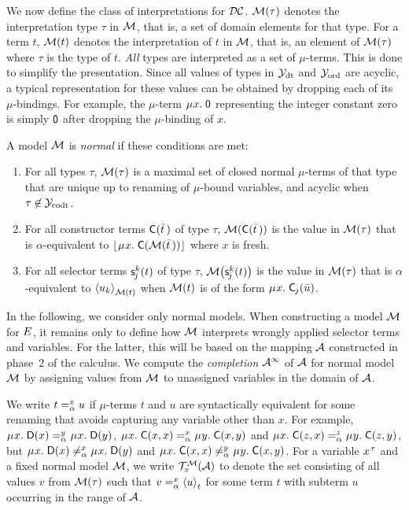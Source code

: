 We now define the class of interpretations for $\thD$.
$\M( \tau )$ denotes the interpretation type $\tau$ in $\M$,
that is, a set of domain elements for that type.
For a term $t$, $\M( t )$ denotes the interpretation of $t$ in $\M$,
that is, an element of $\M( \tau )$ where $\tau$ is the type of $t$.
\emph{All} types are interpreted as a set of $\mu$-terms.
This is done to simplify the presentation.
Since all values of types in $\Data$ and $\Nondata$ are acyclic,
a typical representation for these values can be obtained by
dropping each of its $\mu$-bindings. 
For example, the $\mu$-term $\MU x.\; \const{0}$ representing the integer constant zero
is simply $\const{0}$ after dropping the $\mu$-binding of $x$.

\begin{definition}
\afterDot%
\label{def:norm-model}%
\rm
A model $\M$ is \emph{normal} if these conditions are met:
\begin{enumerate}
\item
For all types $\tau$,
$\M( \tau )$ is a maximal set of closed normal $\mu$-terms of that type that are
unique up to renaming of $\mu$-bound variables,
and acyclic when $\tau \not\in \Codata$.
\item
For all constructor terms $\const{C}( \vec t \,)$ of type $\tau$,
$\M( \const{C}( \vec t \,) )$ is the value
in $\M( \tau )$ that is $\alpha$-equivalent to
$\nf{\MU x.\; \const{C}( \M( \vec t \,) )}$ where $x$ is fresh.
\item
For all selector terms $\const s^k_{\negvthinspace j}( t )$ of type $\tau$, %
$\M\bigl( \const s^k_{\negvthinspace j}( t ) \bigr)$ is the value
in $\M( \tau )$ that is $\alpha$-equivalent to
$\interp{\M( t )}{u_k}$
when $\M( t )$ is of the form $\MU x.\; \const{C}_{\negvthinspace j}( \vec u )$.
\end{enumerate}
\end{definition}

In the following, we consider only normal models.
When constructing a model $\M$ for $\Ec$,
it remains only to define how $\M$ interprets wrongly applied selector terms and variables.
For the latter, this will be based on the mapping $\Val$ constructed in phase~2 of the calculus.
We compute the \emph{completion} $\Val^\AST$ of $\Val$ for normal model $\M$
by assigning values from $\M$ to unassigned variables in the domain of $\Val$.

We write $t \vsimv{x} u$ if $\mu$-terms $t$ and $u$ are syntactically equivalent
for some renaming that avoids capturing any variable other than $x$.
For example,
$\MU x.\; \const{D}( x ) \vsimv{y} \MU x.\; \const{D}( y )$,
$\MU x.\; \const{C}( x, x ) \vsimv{x} \MU y.\; \const{C}( x, y )$ and
$\MU x.\; \const{C}( z, x ) \vsimv{z} \MU y.\; \const{C}( z, y )$,
but
$\MU x.\; \const{D}( x ) \not\vsimv{x} \MU x.\; \const{D}( y )$ and
$\MU x.\; \const{C}( x, x ) \not\vsimv{y} \MU y.\; \const{C}( x, y )$.
For a variable $x\typ{\tau}$ and a fixed normal model $\M$,
we write $\mathcal{T}^\M_x( \Val )$ to denote the set consisting of all values $v$ from $\M( \tau )$
such that $v \vsimv{x} \interp{t}{u}$ for some term $t$ with subterm $u$ occurring in the range of $\Val$.

